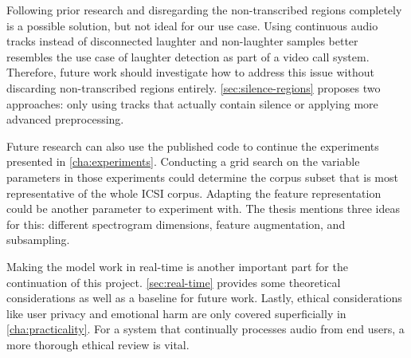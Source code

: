 \documentclass[bsc,frontabs,parskip,deptreport]{infthesis}
\begin{document}
Following prior research and disregarding the non-transcribed regions completely is a possible solution, but not ideal for our use case. Using continuous audio tracks instead of disconnected laughter and non-laughter samples better resembles the use case of laughter detection as part of a video call system. 
Therefore, future work should investigate how to address this issue without discarding non-transcribed regions entirely.
\autoref{sec:silence-regions} proposes two approaches: only using tracks that actually contain silence or applying more advanced preprocessing. 

Future research can also use the published code \citep{Wolter_A_Machine_Learning_2022} to continue the experiments presented in \autoref{cha:experiments}. Conducting a grid search on the variable parameters in those experiments could determine the corpus subset that is most representative of the whole ICSI corpus. Adapting the feature representation could be another parameter to experiment with. The thesis mentions three ideas for this: different spectrogram dimensions, feature augmentation, and subsampling. 

Making the model work in real-time is another important part for the continuation of this project. \autoref{sec:real-time} provides some theoretical considerations as well as a baseline for future work.
Lastly, ethical considerations like user privacy and emotional harm are only covered superficially in \autoref{cha:practicality}. For a system that continually processes audio from end users, a more thorough ethical review is vital.

\end{document}
